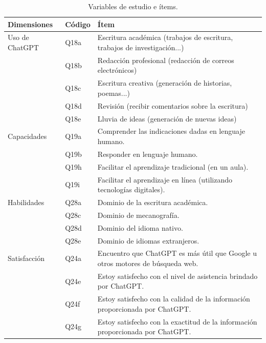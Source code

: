 \documentclass[spanish]{textolivre}
\begin{document}
\begin{table}[h!]
\centering
\begin{threeparttable}
\caption{Variables de estudio e ítems.}\label{tab-2}
\begin{tabular}{p{2.5cm} p{1cm} p{8cm}}
\toprule
Dimensiones & Código & Ítem \\
\midrule
Uso de ChatGPT & Q18a & Escritura académica (trabajos de escritura, trabajos de investigación...) \\
 & Q18b & Redacción profesional (redacción de correos electrónicos) \\
 & Q18c & Escritura creativa (generación de historias, poemas...) \\
 & Q18d & Revisión (recibir comentarios sobre la escritura) \\
 & Q18e & Lluvia de ideas (generación de nuevas ideas) \\
 \addlinespace

Capacidades & Q19a & Comprender las indicaciones dadas en lenguaje humano. \\
 & Q19b & Responder en lenguaje humano. \\
 & Q19h & Facilitar el aprendizaje tradicional (en un aula). \\
 & Q19i & Facilitar el aprendizaje en línea (utilizando tecnologías digitales). \\
\addlinespace
 
Habilidades & Q28a & Dominio de la escritura académica. \\
 & Q28c & Dominio de mecanografía. \\
 & Q28d & Dominio del idioma nativo. \\
 & Q28e & Dominio de idiomas extranjeros. \\
 \addlinespace
 
Satisfacción & Q24a & Encuentro que ChatGPT es más útil que Google u otros motores de búsqueda web. \\
 & Q24e & Estoy satisfecho con el nivel de asistencia brindado por ChatGPT. \\
 & Q24f & Estoy satisfecho con la calidad de la información proporcionada por ChatGPT. \\
 & Q24g & Estoy satisfecho con la exactitud de la información proporcionada por ChatGPT. \\
\bottomrule
\end{tabular}
\end{threeparttable}
\end{table}
\end{document}
